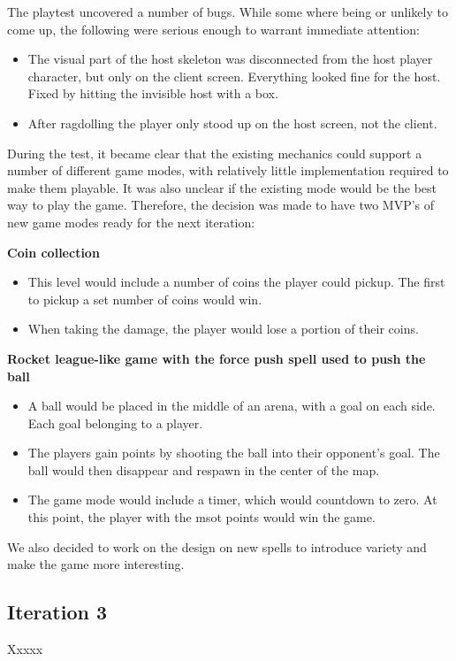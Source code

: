 \documentclass[conference]{IEEEtran}
\begin{document}
    The playtest uncovered a number of bugs. While some where being or unlikely to come up, the following were serious enough to warrant immediate attention:
    \begin{itemize}
        \item The visual part of the host skeleton was disconnected from the host player character, but only on the client screen. Everything looked fine for the host. Fixed by hitting the invisible host with a box.
        \item After ragdolling the player only stood up on the host screen, not the client.
    \end{itemize}

    During the test, it became clear that the existing mechanics could support a number of different game modes, with relatively little implementation required to make them playable. It was also unclear if the existing mode would be the best way to play the game. Therefore, the decision was made to have two MVP's of new game modes ready for the next iteration:

    \textbf{Coin collection}
    \begin{itemize}
        \item This level would include a number of coins the player could pickup. The first to pickup a set number of coins would win.
        \item When taking the damage, the player would lose a portion of their coins.
    \end{itemize}

    \textbf{Rocket league-like game with the force push spell used to push the ball}
    \begin{itemize}
        \item A ball would be placed in the middle of an arena, with a goal on each side. Each goal belonging to a player. 
        \item The players gain points by shooting the ball into their opponent's goal. The ball would then disappear and respawn in the center of the map.
        \item The game mode would include a timer, which would countdown to zero. At this point, the player with the msot points would win the game.
    \end{itemize}

    We also decided to work on the design on new spells to introduce variety and make the game more interesting.

    \subsection{Iteration 3}
    Xxxxx
\end{document}
